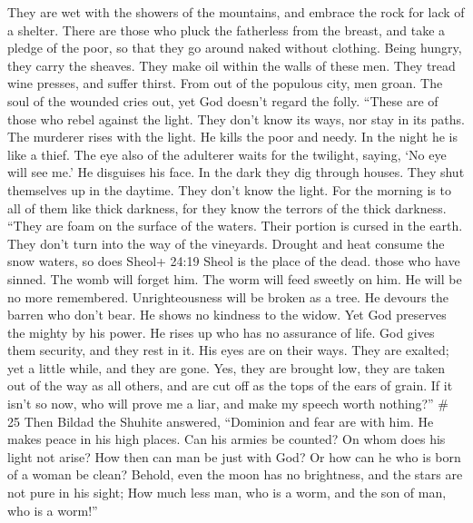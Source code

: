  They are wet with the showers of the mountains, and embrace
the rock for lack of a shelter.  There are those who pluck
the fatherless from the breast, and take a pledge of the poor,
 so that they go around naked without clothing. Being
hungry, they carry the sheaves.  They make oil within the
walls of these men. They tread wine presses, and suffer thirst.
 From out of the populous city, men groan. The soul of the
wounded cries out, yet God doesn't regard the folly. 
``These are of those who rebel against the light. They don't know its
ways, nor stay in its paths.  The murderer rises with the
light. He kills the poor and needy. In the night he is like a thief.
 The eye also of the adulterer waits for the twilight,
saying, `No eye will see me.' He disguises his face.  In
the dark they dig through houses. They shut themselves up in the
daytime. They don't know the light.  For the morning is to
all of them like thick darkness, for they know the terrors of the thick
darkness.  ``They are foam on the surface of the waters.
Their portion is cursed in the earth. They don't turn into the way of
the vineyards.  Drought and heat consume the snow waters,
so does Sheol+ 24:19 Sheol is the place of the dead. those who have
sinned.  The womb will forget him. The worm will feed
sweetly on him. He will be no more remembered. Unrighteousness will be
broken as a tree.  He devours the barren who don't bear. He
shows no kindness to the widow.  Yet God preserves the
mighty by his power. He rises up who has no assurance of life.
 God gives them security, and they rest in it. His eyes are
on their ways.  They are exalted; yet a little while, and
they are gone. Yes, they are brought low, they are taken out of the way
as all others, and are cut off as the tops of the ears of grain.
 If it isn't so now, who will prove me a liar, and make my
speech worth nothing?'' \# 25  Then Bildad the Shuhite
answered,  ``Dominion and fear are with him. He makes peace
in his high places.  Can his armies be counted? On whom does
his light not arise?  How then can man be just with God? Or
how can he who is born of a woman be clean?  Behold, even
the moon has no brightness, and the stars are not pure in his sight;
 How much less man, who is a worm, and the son of man, who
is a worm!''

